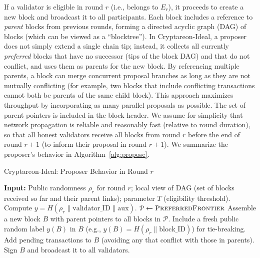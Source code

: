 If a validator is eligible in round $r$ (i.e., belongs to $E_r$), it proceeds to create a new block and broadcast it to all participants. Each block includes a reference to \emph{parent} blocks from previous rounds, forming a directed acyclic graph (DAG) of blocks (which can be viewed as a ``blocktree''). In Cryptareon-Ideal, a proposer does not simply extend a single chain tip; instead, it collects all currently \emph{preferred} blocks that have no successor (tips of the block DAG) and that do not conflict, and uses them as parents for the new block. By referencing multiple parents, a block can merge concurrent proposal branches as long as they are not mutually conflicting (for example, two blocks that include conflicting transactions cannot both be parents of the same child block). This approach maximizes throughput by incorporating as many parallel proposals as possible. The set of parent pointers is included in the block header. We assume for simplicity that network propagation is reliable and reasonably fast (relative to round duration), so that all honest validators receive all blocks from round $r$ before the end of round $r+1$ (to inform their proposal in round $r+1$). We summarize the proposer’s behavior in Algorithm~\ref{alg:propose}.

\begin{algorithm}[t]
\caption{Cryptareon-Ideal: Proposer Behavior in Round $r$}\label{alg:propose}
\begin{algorithmic}[1]
\State \textbf{Input:} Public randomness $\rho_r$ for round $r$; local view of DAG (set of blocks received so far and their parent links); parameter $T$ (eligibility threshold).
\State Compute $y = H(\rho_r \parallel \text{validator\_ID} \parallel \text{aux})$.
 
    \State $\mathcal{P} \gets \Call{PreferredFrontier}{}$ 
    \State Assemble a new block $B$ with parent pointers to all blocks in $\mathcal{P}$.
    \State Include a fresh public random label $y(B)$ in $B$ (e.g., $y(B)=H(\rho_r \parallel \text{block\_ID})$) for tie-breaking.
    \State Add pending transactions to $B$ (avoiding any that conflict with those in parents).
    \State Sign $B$ and broadcast it to all validators.
\EndIf
\end{algorithmic}
\end{algorithm}

